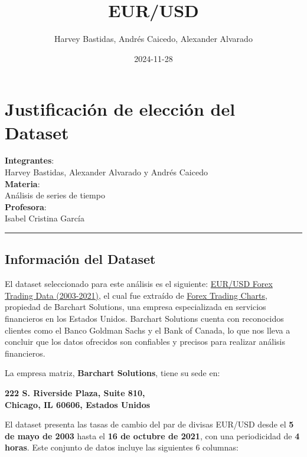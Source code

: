 \documentclass[
]{book}
\title{EUR/USD}
\author{Harvey Bastidas, Andrés Caicedo, Alexander Alvarado}
\date{2024-11-28}
\begin{document}
\maketitle

{
\setcounter{tocdepth}{1}
\tableofcontents
}
\chapter{Justificación de elección del Dataset}\label{justificaciuxf3n-de-elecciuxf3n-del-dataset}

\textbf{Integrantes}:\\
Harvey Bastidas, Alexander Alvarado y Andrés Caicedo\\
\textbf{Materia}:\\
Análisis de series de tiempo\\
\textbf{Profesora}:\\
Isabel Cristina García

\begin{center}\rule{0.5\linewidth}{0.5pt}\end{center}

\section{Información del Dataset}\label{informaciuxf3n-del-dataset}

El dataset seleccionado para este análisis es el siguiente: \href{https://www.kaggle.com/datasets/chandrimad31/eurusd-forex-trading-data-20032021}{EUR/USD Forex Trading Data (2003-2021)}, el cual fue extraído de \href{https://forex.tradingcharts.com/}{Forex Trading Charts}, propiedad de Barchart Solutions, una empresa especializada en servicios financieros en los Estados Unidos. Barchart Solutions cuenta con reconocidos clientes como el Banco Goldman Sachs y el Bank of Canada, lo que nos lleva a concluir que los datos ofrecidos son confiables y precisos para realizar análisis financieros.

La empresa matriz, \textbf{Barchart Solutions}, tiene su sede en:

\textbf{222 S. Riverside Plaza, Suite 810,\\
Chicago, IL 60606, Estados Unidos}

El dataset presenta las tasas de cambio del par de divisas EUR/USD desde el \textbf{5 de mayo de 2003} hasta el \textbf{16 de octubre de 2021}, con una periodicidad de \textbf{4 horas}. Este conjunto de datos incluye las siguientes 6 columnas:
\end{document}
